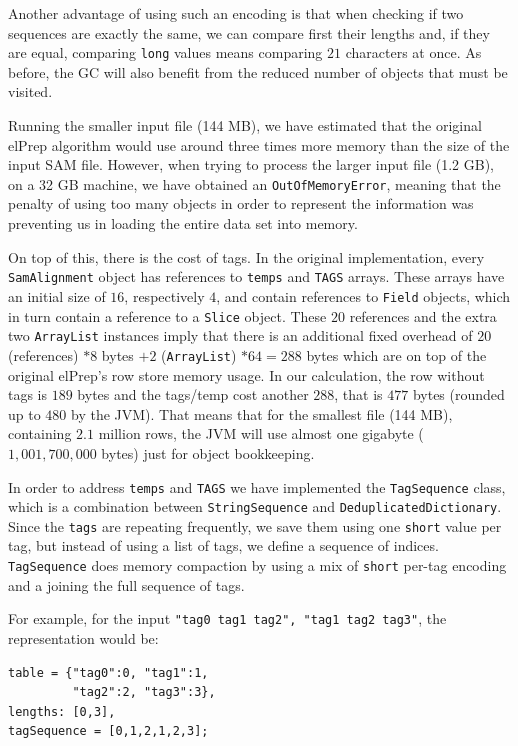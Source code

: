 \documentclass[a4paper,twoside]{article}
\begin{document}
{Another advantage of using such an encoding is that when checking if two sequences are exactly the same, we can compare first their lengths and, if they are equal, comparing {\texttt{long}} values means comparing $21$ characters at once.
As before, the GC will also benefit from the reduced number of objects that must be visited.


Running the smaller input file (144 MB), we have estimated that the original elPrep algorithm would use around three times more memory than the size of the input SAM file.
However, when trying to process the larger input file (1.2 GB), on a 32 GB machine, we have obtained an {\texttt{OutOfMemoryError}}, meaning that the penalty of using too many objects in order to represent the information was preventing us in loading the entire data set into memory.


On top of this, there is the cost of tags.
In the original implementation, every {\texttt{SamAlignment}} object has references to {\texttt{temps}} and {\texttt{TAGS}} arrays.
These arrays have an initial size of $16$, respectively $4$, and contain references to {\texttt{Field}} objects, which in turn contain a reference to a {\texttt{Slice}} object.
These $20$ references and the extra two \texttt{ArrayList} instances imply that there is an additional fixed overhead of $20$ (references) $*8$ bytes $+ 2$ (\texttt{ArrayList}) $* 64 = 288$ bytes which are on top of the original elPrep's row store memory usage.
In our calculation, the row without tags is $189$ bytes and the tags/temp cost another $288$,
that is $477$ bytes (rounded up to $480$ by the JVM).
That means that for the smallest file (144 MB), containing $2.1$ million rows, the JVM will use almost one gigabyte ($1,001,700,000$ bytes) just for object bookkeeping.

In order to address {\texttt{temps}} and {\texttt{TAGS}} we have implemented the {\texttt{TagSequence}} class, which is a combination between {\texttt{StringSequence}} and {\texttt{DeduplicatedDictionary}}.
Since the {\texttt{tags}} are repeating frequently, we save them using one {\texttt{short}} value per tag, but instead of using a list of tags, we define a sequence of indices.
\texttt{TagSequence} does memory compaction by using a mix of \texttt{short} per-tag encoding and a joining the full sequence of tags.

For example, for the input {\texttt{"tag0 tag1 tag2", "tag1 tag2 tag3"}}, the representation would be:
\begin{verbatim}
table = {"tag0":0, "tag1":1, 
         "tag2":2, "tag3":3},
lengths: [0,3], 
tagSequence = [0,1,2,1,2,3]; 
\end{verbatim}

}
\end{document}
